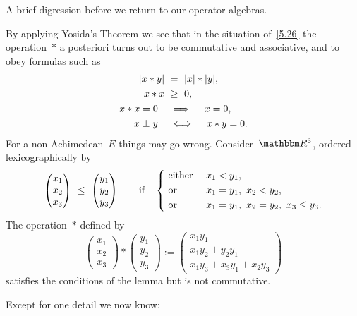 \documentclass[main.tex]{subfiles}
\begin{document}
\begin{psec}{5.17}%
A brief digression before we return to our operator algebras.

By applying Yosida's Theorem we see that
in the situation of~\ref{5.26}
the operation~$*$ a posteriori
turns out to be commutative and associative,
and to obey formulas such as
\begin{alignat*}{2}
|x*y|\ &=\ |x|*|y|\htam{,} \\
x*x \ &\geq\ 0\htam{,} \\
x*x=0\quad&\implies\quad x=0\htam{,} \\
x\perp y\quad&\iff\quad x*y=0\htam{.}
\end{alignat*}
For a non-Achimedean~$E$
things may go wrong.
Consider~$\R^3$,
ordered lexicographically by
\begin{equation*}
\begin{pmatrix}x_1 \\ x_2 \\ x_3\end{pmatrix}
\ \leq\ 
\begin{pmatrix}y_1 \\ y_2 \\ y_3\end{pmatrix}
\qquad\htam{if}\quad
\left\{\ 
\begin{aligned}
&\htam{either }&&x_1<y_1\htam{,} \\
&\htam{or } &&x_1=y_1,\ x_2<y_2\htam{,} \\
&\htam{or } &&x_1=y_1,\ x_2=y_2,\ x_3\leq y_3\htam{.}
\end{aligned}
\right.
\end{equation*}
The operation~$*$ defined by
\begin{equation*}
\begin{pmatrix} x_1 \\ x_2 \\ x_3 \end{pmatrix}
* 
\begin{pmatrix} y_1 \\ y_2 \\ y_3 \end{pmatrix}
:= 
\left(
\begin{array}{l}
x_1 y_1 \\
x_1 y_2 + y_2 y_1 \\
x_1 y_3 + x_3 y_1 + x_2 y_3
\end{array}
\right)
\end{equation*}
satisfies the conditions of the lemma
but is not commutative.
\end{psec}
%
%
\noindent Except for one detail we now know:
\end{document}
